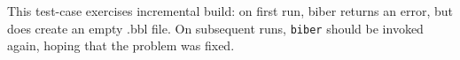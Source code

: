\documentclass{article}
\begin{document}
This  test-case  exercises incremental  build:  on  first run,  biber
returns an  error, but does create  an empty .bbl file.  On subsequent
runs, \texttt{biber} should be invoked  again, hoping that the problem
was fixed.

\nocite{*}

\printbibliography
\end{document}
